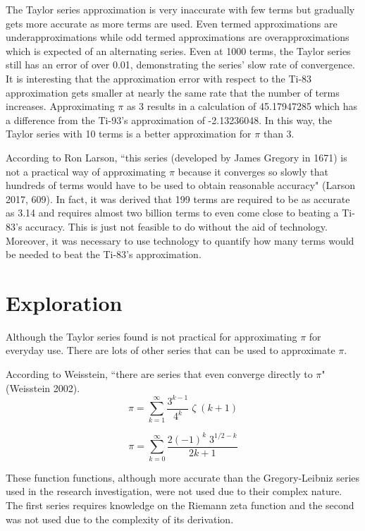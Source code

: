\documentclass[12pt, titlepage]{article}
\begin{document}
The Taylor series approximation is very inaccurate with few terms but gradually gets more accurate as more terms are used. Even termed approximations are underapproximations while odd termed approximations are overapproximations which is expected of an alternating series. Even at 1000 terms, the Taylor series still has an error of over 0.01, demonstrating the series' slow rate of convergence. It is interesting that the approximation error with respect to the Ti-83 approximation gets smaller at nearly the same rate that the number of terms increases. Approximating \(\pi\) as 3 results in a calculation of 45.17947285 which has a difference from the Ti-93's approximation of -2.13236048. In this way, the Taylor series with 10 terms is a better approximation for \(\pi\) than 3. 

According to Ron Larson, ``this series (developed by James Gregory in 1671) is not a practical way of approximating \(\pi\) because it converges so slowly that hundreds of terms would have to be used to obtain reasonable accuracy" (Larson 2017, 609). In fact, it was derived that 199 terms are required to be as accurate as 3.14 and requires almost two billion terms to even come close to beating a Ti-83's accuracy. This is just not feasible to do without the aid of technology. Moreover, it was necessary to use technology to quantify how many terms would be needed to beat the Ti-83's approximation.

\section{Exploration}
Although the Taylor series found is not practical for approximating \(\pi\) for everyday use. There are lots of other series that can be used to approximate \(\pi\). 

According to Weisstein, ``there are series that even converge directly to \(\pi\)" (Weisstein 2002).
\begin{equation*}
    \pi = \sum_{k=1}^{\infty} \frac{3^{k-1}}{4^{k}} \; \zeta \;(k+1)
\end{equation*}

\begin{equation*}
    \pi = \sum_{k=0}^{\infty} \frac{2(-1)^{k} \; 3^{1/2-k}}{{2k+1}}
\end{equation*}

These function functions, although more accurate than the Gregory-Leibniz series used in the research investigation, were not used due to their complex nature. The first series requires knowledge on the Riemann zeta function and the second was not used due to the complexity of its derivation.
\end{document}
